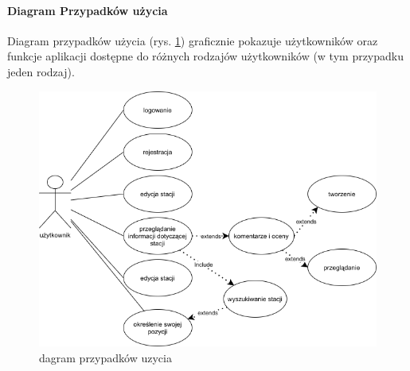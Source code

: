 \paragraph{Diagram Przypadków użycia}
\newline
Diagram przypadków użycia (rys. \ref{fig:usecasediagram}) graficznie pokazuje użytkowników oraz funkcje aplikacji dostępne do różnych rodzajów użytkowników (w tym przypadku jeden rodzaj).
\begin{figure}[ht]
    \centering
        \includegraphics[width=0.7\linewidth]{rys02/use_case_diagram.png}
        \caption{dagram przypadków uzycia \cite{diagrams_net}}
    \label{fig:usecasediagram}
\end{figure}
\newpage
